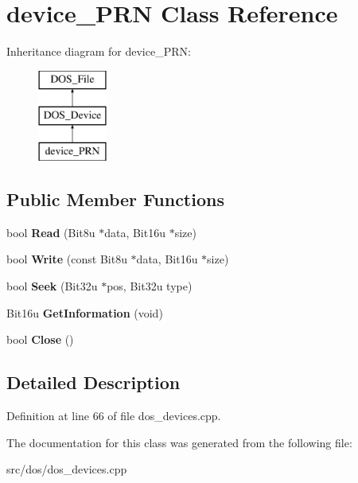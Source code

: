 \hypertarget{classdevice__PRN}{\section{device\-\_\-\-P\-R\-N Class Reference}
\label{classdevice__PRN}
}
Inheritance diagram for device\-\_\-\-P\-R\-N\-:\begin{figure}[H]
\begin{center}
\leavevmode
\includegraphics[height=3.000000cm]{classdevice__PRN}
\end{center}
\end{figure}
\subsection*{Public Member Functions}
\begin{DoxyCompactItemize}
\item 
\hypertarget{classdevice__PRN_ab2635625d0731e0733c11b2cd0732b27}{bool {\bfseries Read} (Bit8u $\ast$data, Bit16u $\ast$size)}\label{classdevice__PRN_ab2635625d0731e0733c11b2cd0732b27}

\item 
\hypertarget{classdevice__PRN_aaa2b70ef35d27fbec4ff1df9af4c6d66}{bool {\bfseries Write} (const Bit8u $\ast$data, Bit16u $\ast$size)}\label{classdevice__PRN_aaa2b70ef35d27fbec4ff1df9af4c6d66}

\item 
\hypertarget{classdevice__PRN_a587013dc3143e4832d6119effe656a61}{bool {\bfseries Seek} (Bit32u $\ast$pos, Bit32u type)}\label{classdevice__PRN_a587013dc3143e4832d6119effe656a61}

\item 
\hypertarget{classdevice__PRN_a65d97b1a638d41ac89e58a4f3a5c5d84}{Bit16u {\bfseries Get\-Information} (void)}\label{classdevice__PRN_a65d97b1a638d41ac89e58a4f3a5c5d84}

\item 
\hypertarget{classdevice__PRN_a92e246dc979d2faef8a0c48700f665ed}{bool {\bfseries Close} ()}\label{classdevice__PRN_a92e246dc979d2faef8a0c48700f665ed}

\end{DoxyCompactItemize}


\subsection{Detailed Description}


Definition at line 66 of file dos\-\_\-devices.\-cpp.



The documentation for this class was generated from the following file\-:\begin{DoxyCompactItemize}
\item 
src/dos/dos\-\_\-devices.\-cpp\end{DoxyCompactItemize}
